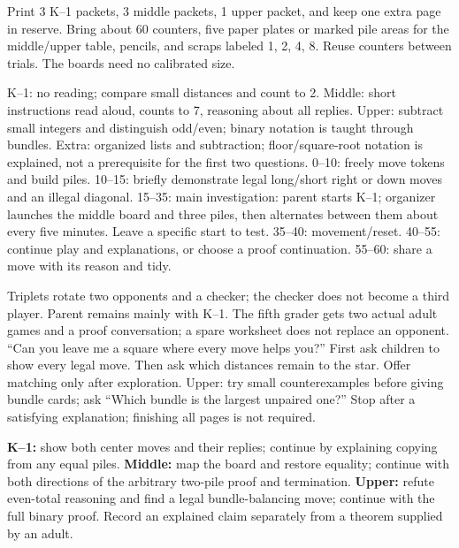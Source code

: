 \documentclass[11pt]{article}
\begin{document}
Print 3 K--1 packets, 3 middle packets, 1 upper packet, and keep one extra page in reserve. Bring about 60 counters, five paper plates or marked pile areas for the middle/upper table, pencils, and scraps labeled 1, 2, 4, 8. Reuse counters between trials. The boards need no calibrated size.

K--1: no reading; compare small distances and count to 2. Middle: short instructions read aloud, counts to 7, reasoning about all replies. Upper: subtract small integers and distinguish odd/even; binary notation is taught through bundles. Extra: organized lists and subtraction; floor/square-root notation is explained, not a prerequisite for the first two questions.
0--10: freely move tokens and build piles. 10--15: briefly demonstrate legal long/short right or down moves and an illegal diagonal. 15--35: main investigation: parent starts K--1; organizer launches the middle board and three piles, then alternates between them about every five minutes. Leave a specific start to test. 35--40: movement/reset. 40--55: continue play and explanations, or choose a proof continuation. 55--60: share a move with its reason and tidy.

Triplets rotate two opponents and a checker; the checker does not become a third player. Parent remains mainly with K--1. The fifth grader gets two actual adult games and a proof conversation; a spare worksheet does not replace an opponent.
``Can you leave me a square where every move helps you?'' First ask children to show every legal move. Then ask which distances remain to the star. Offer matching only after exploration. Upper: try small counterexamples before giving bundle cards; ask ``Which bundle is the largest unpaired one?'' Stop after a satisfying explanation; finishing all pages is not required.

\textbf{K--1:} show both center moves and their replies; continue by explaining copying from any equal piles. \textbf{Middle:} map the board and restore equality; continue with both directions of the arbitrary two-pile proof and termination. \textbf{Upper:} refute even-total reasoning and find a legal bundle-balancing move; continue with the full binary proof. Record an explained claim separately from a theorem supplied by an adult.
\end{document}
